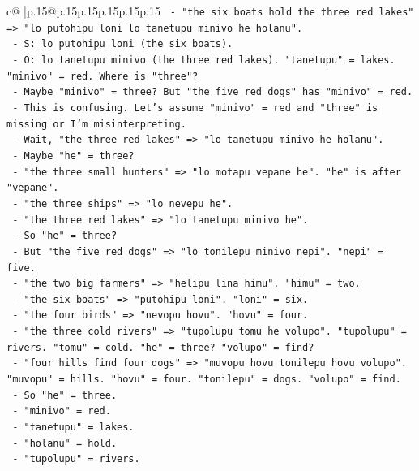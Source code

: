 \documentclass{article}
\begin{document}
{\begin{supertabular}{c@{$\;$}|p{.15\linewidth}@{}p{.15\linewidth}p{.15\linewidth}p{.15\linewidth}p{.15\linewidth}p{.15\linewidth}}
{{{\texttt{       {-} "the six boats hold the three red lakes" => "lo putohipu loni lo tanetupu minivo he holanu".} \\
\texttt{       {-} S: lo putohipu loni (the six boats).} \\
\texttt{       {-} O: lo tanetupu minivo (the three red lakes). "tanetupu" = lakes. "minivo" = red. Where is "three"?} \\
\texttt{       {-} Maybe "minivo" = three? But "the five red dogs" has "minivo" = red.} \\
\texttt{       {-} This is confusing. Let's assume "minivo" = red and "three" is missing or I'm misinterpreting.} \\
\texttt{       {-} Wait, "the three red lakes" => "lo tanetupu minivo he holanu".} \\
\texttt{       {-} Maybe "he" = three?} \\
\texttt{       {-} "the three small hunters" => "lo motapu vepane he". "he" is after "vepane".} \\
\texttt{       {-} "the three ships" => "lo nevepu he".} \\
\texttt{       {-} "the three red lakes" => "lo tanetupu minivo he".} \\
\texttt{       {-} So "he" = three?} \\
\texttt{       {-} But "the five red dogs" => "lo tonilepu minivo nepi". "nepi" = five.} \\
\texttt{       {-} "the two big farmers" => "helipu lina himu". "himu" = two.} \\
\texttt{       {-} "the six boats" => "putohipu loni". "loni" = six.} \\
\texttt{       {-} "the four birds" => "nevopu hovu". "hovu" = four.} \\
\texttt{       {-} "the three cold rivers" => "tupolupu tomu he volupo". "tupolupu" = rivers. "tomu" = cold. "he" = three? "volupo" = find?} \\
\texttt{       {-} "four hills find four dogs" => "muvopu hovu tonilepu hovu volupo". "muvopu" = hills. "hovu" = four. "tonilepu" = dogs. "volupo" = find.} \\
\texttt{       {-} So "he" = three.} \\
\texttt{       {-} "minivo" = red.} \\
\texttt{       {-} "tanetupu" = lakes.} \\
\texttt{       {-} "holanu" = hold.} \\
\texttt{       {-} "tupolupu" = rivers.} \\
}}}
\end{supertabular}}
\end{document}
